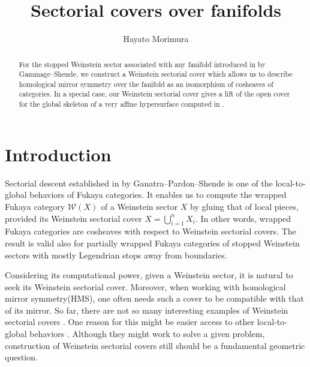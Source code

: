\documentclass[a4paper,12pt, twoside, pdftex]{amsart}
\theoremstyle{definition}
\numberwithin{equation}{section}
\newcommand{\cW}{\mathcal{W}}
\begin{document}
\title{Sectorial covers over fanifolds}
\author[H.~Morimura]{Hayato Morimura}
\address{
Kavli Institute for the Physics and Mathematics of the Universe (WPI),
University of Tokyo,
5-1-5 Kashiwanoha,
Kashiwa,
Chiba,
277-8583,
Japan.}

\date{}
\pagestyle{plain}

\begin{abstract}
For the stopped Weinstein sector associated with any fanifold introduced in
\cite{GS1}
by Gammage--Shende,
we construct a Weinstein sectorial cover
which allows us to describe homological mirror symmetry over the fanifold as an isomorphism of cosheaves of categories.
In a special case,
our Weinstein sectorial cover gives a lift of the open cover for the global skeleton of a very affine hypersurface computed in
\cite{GS2}.
\end{abstract}

\maketitle

\section{Introduction}
Sectorial descent established in
\cite{GPS2}
by Ganatra--Pardon--Shende is one of the local-to-global behaviors of Fukaya categories.
It enables us to compute the wrapped Fukaya category
$\cW(X)$
of a Weinstein sector
$X$
by gluing that of local pieces,
provided its Weinstein sectorial cover
$X = \bigcup^n_{i = 1} X_i$.
In other words,
wrapped Fukaya categories are cosheaves with respect to Weinstein sectorial covers.
The result is valid also for partially wrapped Fukaya categories of stopped Weinstein sectors with mostly Legendrian stops away from boundaries.

Considering its computational power,
given a Weinstein sector,
it is natural to seek its Weinstein sectorial cover. 
Moreover,
when working with homological mirror symmetry(HMS),
one often needs such a cover to be compatible with that of its mirror. 
So far,
there are not so many interesting examples of Weinstein sectorial covers
\cite{CKL, GJ, GL}.
One reason for this might be easier access to other local-to-global behaviors
\cite{GS2, GS1, Lee, MSZ, PS1, PS2, PS3}.
Although they might work to solve a given problem,
construction of Weinstein sectorial covers still should be a fundamental geometric question.
\end{document}
